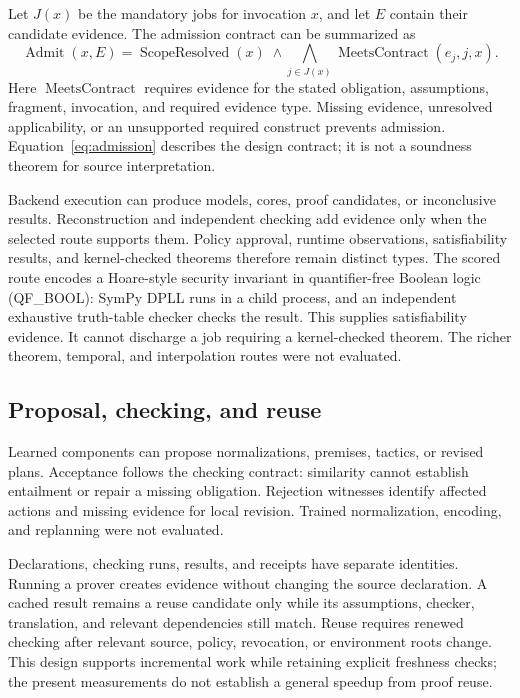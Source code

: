 Let $J(x)$ be the mandatory jobs for invocation $x$, and let $E$ contain their candidate evidence. The admission contract can be summarized as
\begin{equation}
\operatorname{Admit}(x,E)=\operatorname{ScopeResolved}(x)\;\land\!
\bigwedge_{j\in J(x)}\operatorname{MeetsContract}(e_j,j,x).
\label{eq:admission}
\end{equation}
Here $\operatorname{MeetsContract}$ requires evidence for the stated obligation, assumptions, fragment, invocation, and required evidence type. Missing evidence, unresolved applicability, or an unsupported required construct prevents admission. Equation~\ref{eq:admission} describes the design contract; it is not a soundness theorem for source interpretation.

Backend execution can produce models, cores, proof candidates, or inconclusive results. Reconstruction and independent checking add evidence only when the selected route supports them. Policy approval, runtime observations, satisfiability results, and kernel-checked theorems therefore remain distinct types. The scored route encodes a Hoare-style security invariant in quantifier-free Boolean logic (QF\_BOOL): SymPy DPLL runs in a child process, and an independent exhaustive truth-table checker checks the result. This supplies satisfiability evidence. It cannot discharge a job requiring a kernel-checked theorem. The richer theorem, temporal, and interpolation routes were not evaluated.

\subsection{Proposal, checking, and reuse}

Learned components can propose normalizations, premises, tactics, or revised plans. Acceptance follows the checking contract: similarity cannot establish entailment or repair a missing obligation. Rejection witnesses identify affected actions and missing evidence for local revision. Trained normalization, encoding, and replanning were not evaluated.

Declarations, checking runs, results, and receipts have separate identities. Running a prover creates evidence without changing the source declaration. A cached result remains a reuse candidate only while its assumptions, checker, translation, and relevant dependencies still match. Reuse requires renewed checking after relevant source, policy, revocation, or environment roots change. This design supports incremental work while retaining explicit freshness checks; the present measurements do not establish a general speedup from proof reuse.
